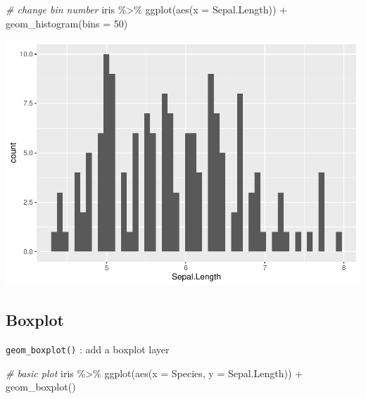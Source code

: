 \documentclass[
]{book}
\newenvironment{Shaded}{\begin{snugshade}}{\end{snugshade}}
\newcommand{\AttributeTok}[1]{\textcolor[rgb]{0.77,0.63,0.00}{#1}}
\newcommand{\CommentTok}[1]{\textcolor[rgb]{0.56,0.35,0.01}{\textit{#1}}}
\newcommand{\DecValTok}[1]{\textcolor[rgb]{0.00,0.00,0.81}{#1}}
\newcommand{\FunctionTok}[1]{\textcolor[rgb]{0.00,0.00,0.00}{#1}}
\newcommand{\NormalTok}[1]{#1}
\newcommand{\SpecialCharTok}[1]{\textcolor[rgb]{0.00,0.00,0.00}{#1}}
\begin{document}
\begin{Shaded}
\begin{Highlighting}[]
\CommentTok{\# change bin number}
\NormalTok{iris }\SpecialCharTok{\%\textgreater{}\%} 
  \FunctionTok{ggplot}\NormalTok{(}\FunctionTok{aes}\NormalTok{(}\AttributeTok{x =}\NormalTok{ Sepal.Length)) }\SpecialCharTok{+}
  \FunctionTok{geom\_histogram}\NormalTok{(}\AttributeTok{bins =} \DecValTok{50}\NormalTok{)}
\end{Highlighting}
\end{Shaded}

\begin{center}\includegraphics{_main_files/figure-latex/unnamed-chunk-113-3} \end{center}

\hypertarget{boxplot}{%
\subsection{Boxplot}\label{boxplot}}

\texttt{geom\_boxplot()} : add a boxplot layer

\begin{Shaded}
\begin{Highlighting}[]
\CommentTok{\# basic plot}
\NormalTok{iris }\SpecialCharTok{\%\textgreater{}\%} 
  \FunctionTok{ggplot}\NormalTok{(}\FunctionTok{aes}\NormalTok{(}\AttributeTok{x =}\NormalTok{ Species,}
             \AttributeTok{y =}\NormalTok{ Sepal.Length)) }\SpecialCharTok{+}
  \FunctionTok{geom\_boxplot}\NormalTok{()}
\end{Highlighting}
\end{Shaded}
\end{document}
